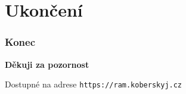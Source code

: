 \documentclass{beamer}
\begin{document}
\section{Ukončení}
\begin{frame}
	\frametitle{Konec}

    \bigskip
    \bigskip
    \bigskip
    \bigskip
    \bigskip
    \bigskip
    \begin{center}
        \textbf{Děkuji za pozornost}
    \end{center}
    \bigskip
    \bigskip
    \bigskip
    \bigskip
    \bigskip
    \bigskip
    Dostupné na adrese \texttt{https://ram.koberskyj.cz}
\end{frame}
\end{document}
